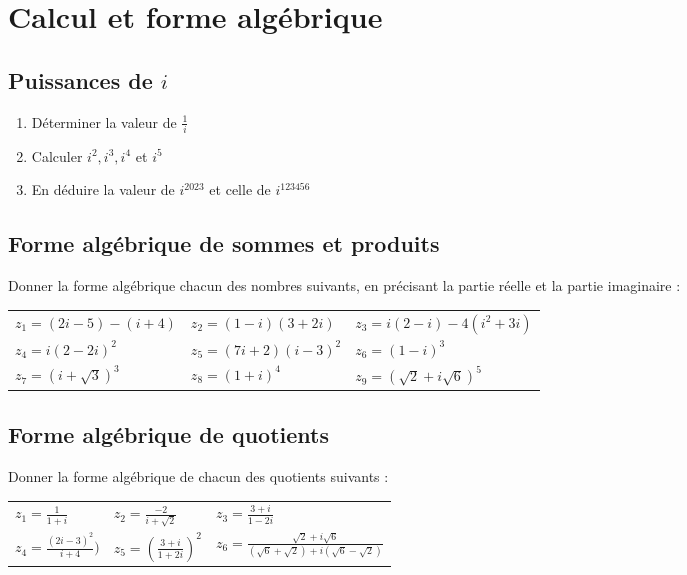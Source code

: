 \documentclass[oneside,12pt]{article}          %
\begin{document}
\section{Calcul et forme algébrique}

\subsection{Puissances de $i$}
\begin{enumerate}
    \item Déterminer la valeur de $\frac{1}{i}$
    \item Calculer $i^2, i^3, i^4$ et $i^5$
    \item En déduire la valeur de $i^{2023}$ et celle de $i^{123456}$
\end{enumerate}



\subsection{Forme algébrique de sommes et produits}
Donner la forme algébrique chacun des nombres suivants, en précisant la partie réelle et la partie imaginaire :\\
\renewcommand{\arraystretch}{1.5}
\begin{tabular}{p{} p{} p{}}
    $z_1=(2i-5)-(i+4)$ & $z_2=(1-i)(3+2i)$ & $z_3=i(2-i)-4(i^2+3i)$ \\
    $z_4=i(2-2i)^2$ & $z_5=(7i+2)(i-3)^2$ & $z_6=(1-i)^3$ \\
    $z_7=(i+\sqrt{3})^3$ & $z_8=(1+i)^4$ & $z_9=(\sqrt{2}+i\sqrt{6})^5$
\end{tabular}



\subsection{Forme algébrique de quotients}
Donner la forme algébrique de chacun des quotients suivants :\\
\renewcommand{\arraystretch}{1.5}
\begin{tabular}{p{} p{} p{}}
    $z_1=\frac{1}{1+i}$ & $z_2=\frac{-2}{i+\sqrt{2}}$ & $z_3=\frac{3+i}{1-2i}$ \\
    $z_4=\frac{(2i-3)^2}{i+4})$ & $z_5=\left(\frac{3+i}{1+2i}\right)^2$ & $z_6=\frac{\sqrt{2}+i\sqrt{6}}{(\sqrt{6}+\sqrt{2})+i(\sqrt{6}-\sqrt{2})}$ \\
\end{tabular}
\end{document}
